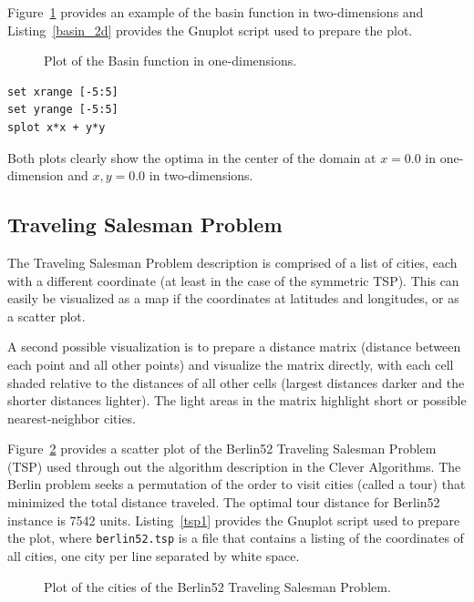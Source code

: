 \documentclass[a4paper, 11pt]{article}
\begin{document}
Figure~\ref{plot:basin2} provides an example of the basin function in two-dimensions and Listing~\ref{basin_2d} provides the Gnuplot script used to prepare the plot.

\begin{figure}[htp]
\centering

\caption{Plot of the Basin function in one-dimensions.}
\label{plot:basin2}
\end{figure}

\begin{lstlisting}[caption=Gnuplot script for plotting the Basin function in two-dimensions, label=basin_2d]
set xrange [-5:5]
set yrange [-5:5]
splot x*x + y*y
\end{lstlisting}

Both plots clearly show the optima in the center of the domain at $x=0.0$ in one-dimension and $x,y=0.0$ in two-dimensions.

\subsection{Traveling Salesman Problem}
The Traveling Salesman Problem description is comprised of a list of cities, each with a different coordinate (at least in the case of the symmetric TSP). This can easily be visualized as a map if the coordinates at latitudes and longitudes, or as a scatter plot.

A second possible visualization is to prepare a distance matrix (distance between each point and all other points) and visualize the matrix directly, with each cell shaded relative to the distances of all other cells (largest distances darker and the shorter distances lighter). The light areas in the matrix highlight short or possible nearest-neighbor cities.

Figure~\ref{plot:tsp1} provides a scatter plot of the Berlin52 Traveling Salesman Problem (TSP) used through out the algorithm description in the Clever Algorithms. The Berlin problem seeks a permutation of the order to visit cities (called a tour) that minimized the total distance traveled. The optimal tour distance for Berlin52 instance is 7542 units. Listing~\ref{tsp1} provides the Gnuplot script used to prepare the plot, where \texttt{berlin52.tsp} is a file that contains a listing of the coordinates of all cities, one city per line separated by white space.

\begin{figure}[htp]
\centering

\caption{Plot of the cities of the Berlin52 Traveling Salesman Problem.}
\label{plot:tsp1}
\end{figure}
\end{document}
